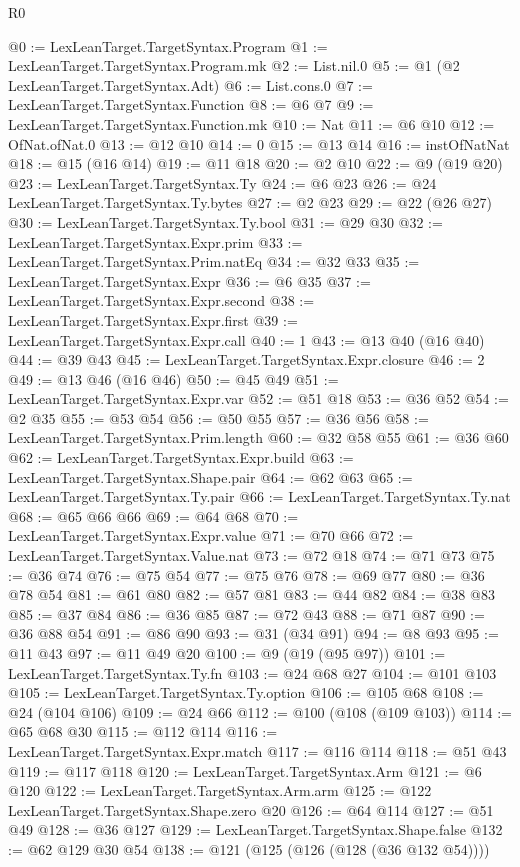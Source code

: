 \begin{lexlean}{R0}
\begin{coremodule}
@0 := LexLeanTarget.TargetSyntax.Program
@1 := LexLeanTarget.TargetSyntax.Program.mk
@2 := List.nil.{0}
@5 := @1 (@2 LexLeanTarget.TargetSyntax.Adt)
@6 := List.cons.{0}
@7 := LexLeanTarget.TargetSyntax.Function
@8 := @6 @7
@9 := LexLeanTarget.TargetSyntax.Function.mk
@10 := Nat
@11 := @6 @10
@12 := OfNat.ofNat.{0}
@13 := @12 @10
@14 := 0
@15 := @13 @14
@16 := instOfNatNat
@18 := @15 (@16 @14)
@19 := @11 @18
@20 := @2 @10
@22 := @9 (@19 @20)
@23 := LexLeanTarget.TargetSyntax.Ty
@24 := @6 @23
@26 := @24 LexLeanTarget.TargetSyntax.Ty.bytes
@27 := @2 @23
@29 := @22 (@26 @27)
@30 := LexLeanTarget.TargetSyntax.Ty.bool
@31 := @29 @30
@32 := LexLeanTarget.TargetSyntax.Expr.prim
@33 := LexLeanTarget.TargetSyntax.Prim.natEq
@34 := @32 @33
@35 := LexLeanTarget.TargetSyntax.Expr
@36 := @6 @35
@37 := LexLeanTarget.TargetSyntax.Expr.second
@38 := LexLeanTarget.TargetSyntax.Expr.first
@39 := LexLeanTarget.TargetSyntax.Expr.call
@40 := 1
@43 := @13 @40 (@16 @40)
@44 := @39 @43
@45 := LexLeanTarget.TargetSyntax.Expr.closure
@46 := 2
@49 := @13 @46 (@16 @46)
@50 := @45 @49
@51 := LexLeanTarget.TargetSyntax.Expr.var
@52 := @51 @18
@53 := @36 @52
@54 := @2 @35
@55 := @53 @54
@56 := @50 @55
@57 := @36 @56
@58 := LexLeanTarget.TargetSyntax.Prim.length
@60 := @32 @58 @55
@61 := @36 @60
@62 := LexLeanTarget.TargetSyntax.Expr.build
@63 := LexLeanTarget.TargetSyntax.Shape.pair
@64 := @62 @63
@65 := LexLeanTarget.TargetSyntax.Ty.pair
@66 := LexLeanTarget.TargetSyntax.Ty.nat
@68 := @65 @66 @66
@69 := @64 @68
@70 := LexLeanTarget.TargetSyntax.Expr.value
@71 := @70 @66
@72 := LexLeanTarget.TargetSyntax.Value.nat
@73 := @72 @18
@74 := @71 @73
@75 := @36 @74
@76 := @75 @54
@77 := @75 @76
@78 := @69 @77
@80 := @36 @78 @54
@81 := @61 @80
@82 := @57 @81
@83 := @44 @82
@84 := @38 @83
@85 := @37 @84
@86 := @36 @85
@87 := @72 @43
@88 := @71 @87
@90 := @36 @88 @54
@91 := @86 @90
@93 := @31 (@34 @91)
@94 := @8 @93
@95 := @11 @43
@97 := @11 @49 @20
@100 := @9 (@19 (@95 @97))
@101 := LexLeanTarget.TargetSyntax.Ty.fn
@103 := @24 @68 @27
@104 := @101 @103
@105 := LexLeanTarget.TargetSyntax.Ty.option
@106 := @105 @68
@108 := @24 (@104 @106)
@109 := @24 @66
@112 := @100 (@108 (@109 @103))
@114 := @65 @68 @30
@115 := @112 @114
@116 := LexLeanTarget.TargetSyntax.Expr.match
@117 := @116 @114
@118 := @51 @43
@119 := @117 @118
@120 := LexLeanTarget.TargetSyntax.Arm
@121 := @6 @120
@122 := LexLeanTarget.TargetSyntax.Arm.arm
@125 := @122 LexLeanTarget.TargetSyntax.Shape.zero @20
@126 := @64 @114
@127 := @51 @49
@128 := @36 @127
@129 := LexLeanTarget.TargetSyntax.Shape.false
@132 := @62 @129 @30 @54
@138 := @121 (@125 (@126 (@128 (@36 @132 @54))))

\end{coremodule}
\end{lexlean}
